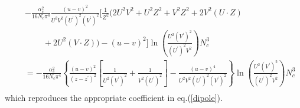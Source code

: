 \documentclass[11pt,a4paper]{article}
\begin{document}
\begin{eqnarray}
&&-\frac{\alpha_{s}^{2}}{16N_{c}\pi^{4}}
\frac{(u-v)^{2}}{U^{2}V^{2}(U^{\prime})^{2}(V^{\prime})^{2}}\Big[\frac{1}{Z^{2}}(2U^{2}V^{2}+U^{2}Z^{2}+V^{2}Z^{2}+2V^{2}(U\cdot Z)\nonumber \\
&&\ \ \ \ \ \ \ \ \ \ +2U^{2}(V\cdot Z))-(u-v)^{2}\Big] \ln\left(\frac{U^{2}(V^{\prime})^{2}}{(U^{\prime})^{2}V^{2}}\right)N_{c}^{3}\nonumber \\
&&=-\frac{\alpha_{s}^{2}}{16N_{c}\pi^{4}}
\left\{ \frac{(u-v)^{2}}{(z-z^{\prime})^{2}}\left[\frac{1}{U^{2}(V^{\prime})^{2}}+\frac{1}{V^{2}(U^{\prime})^{2}}\right]-\frac{(u-v)^{4}}{U^{2}V^{2}(U^{\prime})^{2}(V^{\prime})^{2}}\right\} \ln\left(\frac{U^{2}(V^{\prime})^{2}}{(U^{\prime})^{2}V^{2}}\right)N_{c}^{3}\nonumber \\
\end{eqnarray}
which reproduces the appropriate coefficient in eq.(\ref{dipole}).
\end{document}
